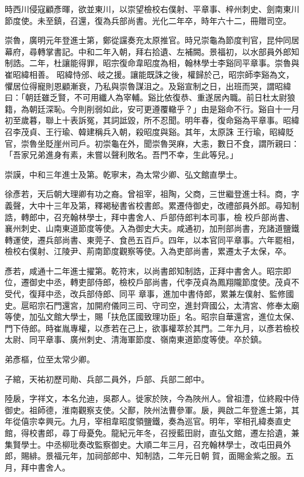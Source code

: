 \begin{pinyinscope}
 時西川侵寇顧彥暉，欲並東川，以崇望檢校右僕射、平章事、梓州刺史、劍南東川節度使。未至鎮，召還，復為兵部尚書。光化二年卒，時年六十二，冊贈司空。



 崇魯，廣明元年登進士第，鄭從讜奏充太原推官。時兄崇龜為節度判官，昆仲同居幕府，尋轉掌書記。中和二年入朝，拜右拾遺、左補闕。景福初，以水部員外郎知制誥。二年，杜讓能得罪，昭宗復命韋昭度為相，翰林學士李谿同平章事。崇魯與崔昭緯相善。
 昭緯恃邠、岐之援。讓能既誅之後，權歸於己，昭宗師李谿為文，懼居位得寵則恩顧漸衰，乃私與崇魯謀沮之。及谿宣制之日，出班而哭，謂昭緯曰：「朝廷雖乏賢，不可用纖人為宰輔。谿比依復恭、重遂居內職。前日杜太尉狼籍，為朝廷深恥。今則削弱如此，安可更遵覆轍乎？」由是谿命不行。谿自十一月初至歲暮，聯上十表訴冤，其詞詆毀，所不忍聞。明年春，復命谿為平章事。昭緯召李茂貞、王行瑜、韓建稱兵入朝，殺昭度與谿。其年，太原誅
 王行瑜，昭緯貶官，崇魯坐貶崖州司戶。初崇龜在外，聞崇魯哭麻，大恚，數日不食，謂所親曰：「吾家兄弟進身有素，未嘗以聲利敗名。吾門不幸，生此等兒。」



 崇謨，中和三年進士及第。乾寧末，為太常少卿、弘文館直學士。



 徐彥若，天后朝大理卿有功之裔。曾祖宰，祖陶，父商，三世繼登進士科。商，字義聲，大中十三年及第，釋褐秘書省校書郎。累遷侍御史，改禮部員外郎。尋知制誥，轉郎中，召充翰林學士，拜中書舍人、戶部侍郎判本司事，檢
 校戶部尚書、襄州刺史、山南東道節度等使。入為御史大夫。咸通初，加刑部尚書，充諸道鹽鐵轉運使，遷兵部尚書、東莞子、食邑五百戶。四年，以本官同平章事。六年罷相，檢校右僕射、江陵尹、荊南節度觀察等使。入為吏部尚書，累遷太子太保，卒。



 彥若，咸通十二年進士擢第。乾符末，以尚書郎知制誥，正拜中書舍人。昭宗即位，遷御史中丞，轉吏部侍郎，檢校戶部尚書，代李茂貞為鳳翔隴節度使。茂貞不受代，復拜中丞，改兵部侍郎、同平
 章事，進加中書侍郎，累兼左僕射、監修國史。扈昭宗石門還宮，加開府儀同三司、守司空，進封齊國公，太清宮、修奉太廟等使，加弘文館大學士，賜「扶危匡國致理功臣」名。昭宗自華還宮，進位太保、門下侍郎。時崔胤專權，以彥若在己上，欲事權萃於其門。二年九月，以彥若檢校太尉、同平章事、廣州刺史、清海軍節度、嶺南東道節度等使。卒於鎮。



 弟彥樞，位至太常少卿。



 子綰，天祐初歷司勛、兵部二員外，戶部、兵部二郎中。



 陸扆，字祥文，本名允迪，吳郡人。徙家於陜，今為陜州人。曾祖澧，位終殿中侍御史。祖師德，淮南觀察支使。父鄯，陜州法曹參軍。扆，興啟二年登進士第，其年從僖宗幸興元。九月，宰相韋昭度領鹽鐵，奏為巡官。明年，宰相孔緯奏直史館，得校書郎，尋丁母憂免。龍紀元年冬，召授藍田尉，直弘文館，遷左拾遺，兼集賢學士。中丞柳玭奏改監察御史。大順二年三月，召充翰林學士，改屯田員外郎，賜緋。景福元年，加祠部郎中、知制誥，二年元日朝
 賀，面賜金紫之服。五月，拜中書舍人。




\end{pinyinscope}
